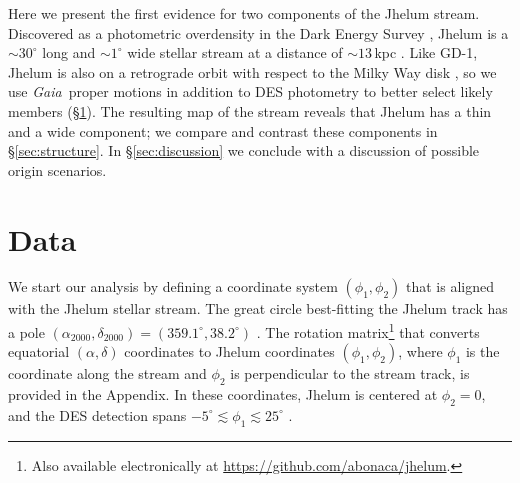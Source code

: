 \documentclass[twocolumn]{aastex62}
\newcommand{\gaia}{\textsl{Gaia}}
\begin{document}
Here we present the first evidence for two components of the Jhelum stream.
Discovered as a photometric overdensity in the Dark Energy Survey \citep[DES,][]{abbott2018}, Jhelum is a $\sim30^\circ$ long and $\sim1^\circ$ wide stellar stream at a distance of $\sim13\,$kpc \citep{shipp2018}.
Like GD-1, Jhelum is also on a retrograde orbit with respect to the Milky Way disk \citep{malhan2018}, so we use \gaia\ proper motions in addition to DES photometry to better select likely members (\S\ref{sec:data}).
The resulting map of the stream reveals that Jhelum has a thin and a wide component; we compare and contrast these components in \S\ref{sec:structure}.
In \S\ref{sec:discussion} we conclude with a discussion of possible origin scenarios.

% 
% 


\section{Data}
\label{sec:data}
We start our analysis by defining a coordinate system $(\phi_1,\phi_2)$ that is aligned with the Jhelum stellar stream.
The great circle best-fitting the Jhelum track has a pole $(\alpha_{2000},\delta_{2000}) = (359.1^\circ, 38.2^\circ)$ \citep{shipp2018}.
The rotation matrix\footnote{Also available electronically at \url{https://github.com/abonaca/jhelum}.} that converts equatorial $(\alpha, \delta)$ coordinates to Jhelum coordinates $(\phi_1, \phi_2)$, where $\phi_1$ is the coordinate along the stream and $\phi_2$ is perpendicular to the stream track, is provided in the Appendix.
In these coordinates, Jhelum is centered at $\phi_2=0$, and the DES detection spans $-5^\circ\lesssim\phi_1\lesssim25^\circ$ \citep{shipp2018}.
\end{document}
